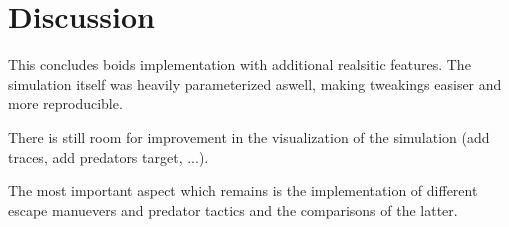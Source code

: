\documentclass[9pt]{pnas-new}
\begin{document}
\pagebreak

\section*{Discussion}

This concludes boids implementation with additional realsitic features.
The simulation itself was heavily parameterized aswell, making tweakings easiser and more reproducible.

There is still room for improvement in the visualization of the simulation (add traces, add predators target, ...).

The most important aspect which remains is the implementation of different escape manuevers and predator tactics and the comparisons of the latter.


\showacknow %


\begin{multicols}{2}
    \section*{\bibname}
    
\end{multicols}
\end{document}
